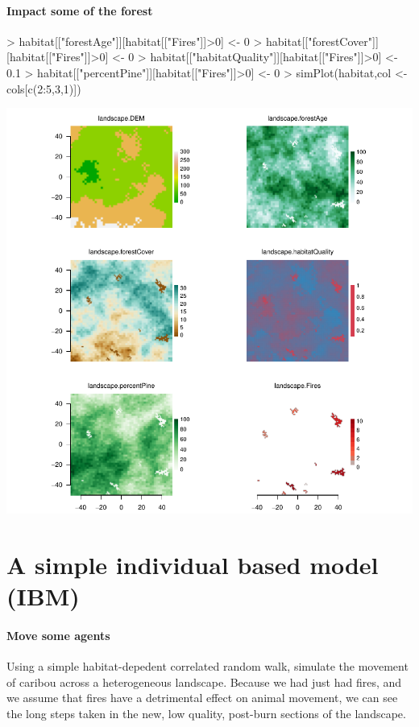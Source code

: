 \documentclass{article}
\begin{document}
\paragraph{Impact some of the forest}
\begin{Schunk}
\begin{Sinput}
> habitat[["forestAge"]][habitat[["Fires"]]>0] <- 0
> habitat[["forestCover"]][habitat[["Fires"]]>0] <- 0
> habitat[["habitatQuality"]][habitat[["Fires"]]>0] <- 0.1
> habitat[["percentPine"]][habitat[["Fires"]]>0] <- 0
> simPlot(habitat,col <- cols[c(2:5,3,1)])
\end{Sinput}
\end{Schunk}
\includegraphics{introduction-fire-impacts-maps}

\section{A simple individual based model (IBM)}
\paragraph{Move some agents}
Using a simple habitat-depedent correlated random walk, simulate the movement of caribou across a heterogeneous landscape. Because we had just had fires, and we assume that fires have a detrimental effect on animal movement, we can see the long steps taken in the new, low quality, post-burn sections of the landscape.
\end{document}
